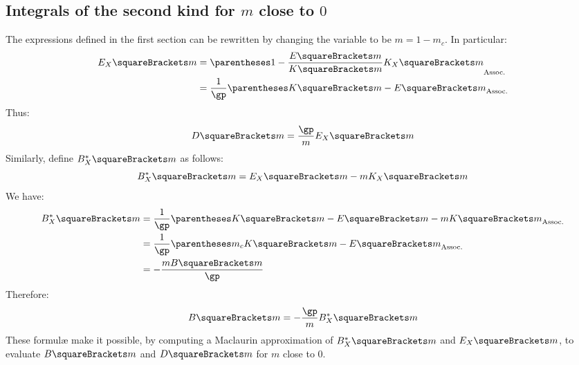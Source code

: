 \documentclass[10pt, a4paper, twoside]{basestyle}
\begin{document}
\subsection*{Integrals of the second kind for $m$ close to $0$}
The expressions defined in the first section can be rewritten by changing the variable to be $m = 1 - m_c$.  In particular:
\begin{align*}
E_X\of{m} &= \pa{1 - \frac{E\of{m}}{K\of{m}}K_X\of{m}}\\
&= \frac{1}{\gp}\pa{K\of{m} - E\of{m}}
\end{align*}
Thus:
\[
D\of{m} = \frac{\gp}{m}E_X\of{m}
\]
Similarly, define $B_X^*\of{m}$ as follows:
\[
B_X^*\of{m} = E_X\of{m} - m K_X\of{m}
\]
We have:
\begin{align*}
B_X^*\of{m} &= \frac{1}{\gp}\pa{K\of{m} - E\of{m} - m K\of{m}}\\
&= \frac{1}{\gp}\pa{m_c K\of{m} - E\of{m}}\\
&= -\frac{m B\of{m}}{\gp}
\end{align*}
Therefore:
\[
B\of{m} = -\frac{\gp}{m} B_X^*\of{m}
\]
These formulæ make it possible, by computing a Maclaurin approximation of $B_X^*\of{m}$ and $E_X\of{m}$, to evaluate $B\of{m}$
and $D\of{m}$ for $m$ close to $0$.
\printbibliography
\end{document}
